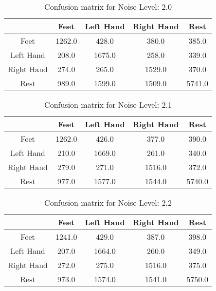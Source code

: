 \begin{table}[!htbp]
    \centering
    \begin{tabular}{|c||c|c|c|c|}
        \hline
		 & Feet & Left Hand & Right Hand & Rest \\
        \hline
        \hline
        Feet & 1262.0 & 428.0 & 380.0 & 385.0 \\
        \hline
        Left Hand & 208.0 & 1675.0 & 258.0 & 339.0 \\
        \hline
        Right Hand & 274.0 & 265.0 & 1529.0 & 370.0 \\
        \hline
        Rest & 989.0 & 1599.0 & 1509.0 & 5741.0 \\
        \hline
    \end{tabular}
    \caption{Confusion matrix for Noise Level: 2.0}
\end{table}

\begin{table}[!htbp]
    \centering
    \begin{tabular}{|c||c|c|c|c|}
        \hline
		 & Feet & Left Hand & Right Hand & Rest \\
        \hline
        \hline
        Feet & 1262.0 & 426.0 & 377.0 & 390.0 \\
        \hline
        Left Hand & 210.0 & 1669.0 & 261.0 & 340.0 \\
        \hline
        Right Hand & 279.0 & 271.0 & 1516.0 & 372.0 \\
        \hline
        Rest & 977.0 & 1577.0 & 1544.0 & 5740.0 \\
        \hline
    \end{tabular}
    \caption{Confusion matrix for Noise Level: 2.1}
\end{table}

\begin{table}[!htbp]
    \centering
    \begin{tabular}{|c||c|c|c|c|}
        \hline
		 & Feet & Left Hand & Right Hand & Rest \\
        \hline
        \hline
        Feet & 1241.0 & 429.0 & 387.0 & 398.0 \\
        \hline
        Left Hand & 207.0 & 1664.0 & 260.0 & 349.0 \\
        \hline
        Right Hand & 272.0 & 275.0 & 1516.0 & 375.0 \\
        \hline
        Rest & 973.0 & 1574.0 & 1541.0 & 5750.0 \\
        \hline
    \end{tabular}
    \caption{Confusion matrix for Noise Level: 2.2}
\end{table}

